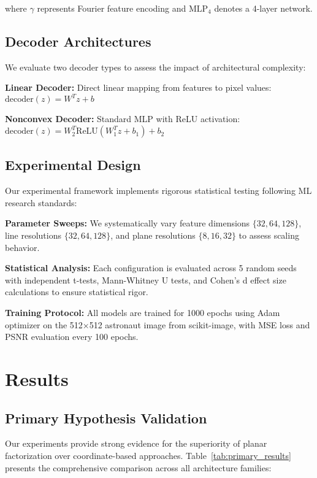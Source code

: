 \documentclass[10pt,twocolumn,letterpaper]{article}
\begin{document}
where $\gamma$ represents Fourier feature encoding and $\text{MLP}_4$ denotes a 4-layer network.

\subsection{Decoder Architectures}

We evaluate two decoder types to assess the impact of architectural complexity:

\textbf{Linear Decoder:} Direct linear mapping from features to pixel values:
$\text{decoder}(z) = W^T z + b$

\textbf{Nonconvex Decoder:} Standard MLP with ReLU activation:
$\text{decoder}(z) = W_2^T \text{ReLU}(W_1^T z + b_1) + b_2$

\subsection{Experimental Design}

Our experimental framework implements rigorous statistical testing following ML research standards:

\textbf{Parameter Sweeps:} We systematically vary feature dimensions $\{32, 64, 128\}$, line resolutions $\{32, 64, 128\}$, and plane resolutions $\{8, 16, 32\}$ to assess scaling behavior.

\textbf{Statistical Analysis:} Each configuration is evaluated across 5 random seeds with independent t-tests, Mann-Whitney U tests, and Cohen's d effect size calculations to ensure statistical rigor.

\textbf{Training Protocol:} All models are trained for 1000 epochs using Adam optimizer on the 512×512 astronaut image from scikit-image, with MSE loss and PSNR evaluation every 100 epochs.

\section{Results}

\subsection{Primary Hypothesis Validation}

Our experiments provide strong evidence for the superiority of planar factorization over coordinate-based approaches. Table~\ref{tab:primary_results} presents the comprehensive comparison across all architecture families:
\end{document}
